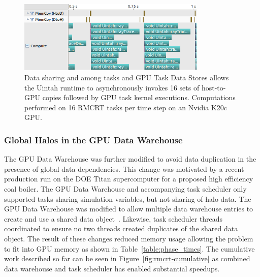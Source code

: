 \documentclass[12pt]{article}
\begin{document}
\begin{figure}
	\centering
	\includegraphics[width=0.80\textwidth]{figures/rmcrt_after_zoomed_sidebar.png}
	\caption{Data sharing and among tasks and GPU Task Data Stores allows the Uintah runtime to asynchronously invokes 16 sets of host-to-GPU copies followed by GPU task kernel executions.  Computations performed on 16 RMCRT tasks per time step on an Nvidia K20c GPU.}
	\label{fig:rmcrt-overlap}
\end{figure}

\subsubsection{Global Halos in the GPU Data Warehouse}
\label{ch:global_halos_gpu_data_warehouse}
The GPU Data Warehouse was further modified to avoid data duplication in the presence of global data dependencies.  This change was motivated by a recent production run on the DOE Titan supercomputer for a proposed high efficiency coal boiler.  The GPU Data Warehouse and accompanying task scheduler only supported tasks sharing simulation variables, but not sharing of halo data.  The GPU Data Warehouse was modified to allow multiple data warehouse entries to create and use a shared data object~\cite{espm2-brad}.  Likewise, task scheduler threads coordinated to ensure no two threads created duplicates of the shared data object.  The result of these changes reduced memory usage allowing the problem to fit into GPU memory as shown in Table~\ref{table:phase_times}.  The cumulative work described so far can be seen in Figure~\ref{fig:rmcrt-cumulative} as combined data warehouse and task scheduler has enabled substantial speedups.
\end{document}

